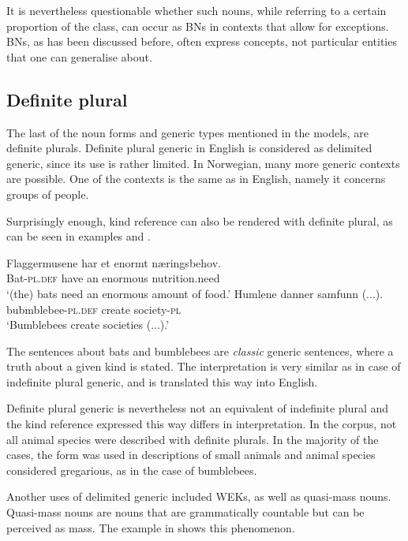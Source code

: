 \documentclass[output=paper]{langsci/langscibook}
\begin{document}
It is nevertheless questionable whether such nouns, while referring to a certain proportion of the class, can occur as BNs in contexts that allow for exceptions. BNs, as has been discussed before, often express concepts, not particular entities that one can generalise about.


\subsection{Definite plural}
\label{sub:defpl}
The last of the noun forms and generic types mentioned in the models, are definite plurals. Definite plural generic in English is considered as delimited generic, since its use is rather limited. In Norwegian, many more generic contexts are possible. One of the contexts is the same as in English, namely it concerns groups of people.

Surprisingly enough, kind reference can also be rendered with definite plural, as can be seen in examples  and .

\ea\label{ex:bats}
	\gll Flaggermusene har et enormt næringsbehov. \\
		Bat-\textsc{pl}.\textsc{def} have an enormous nutrition.need \\
	\glt `(the) bats need an enormous amount of food.'
\ex\label{ex:bumblebees}
	\gll Humlene danner samfunn (...). \\
		bubmblebee-\textsc{pl}.\textsc{def} create society-\textsc{pl} \\
	\glt `Bumblebees create societies (...).'
\z
    
The sentences about bats and bumblebees are \textit{classic} generic sentences, where a truth about a given kind is stated. The interpretation is very similar as in case of indefinite plural generic, and is translated this way into English.

Definite plural generic is nevertheless not an equivalent of indefinite plural and the kind reference expressed this way differs in interpretation. In the corpus, not all animal species were described with definite plurals. In the majority of the cases, the form was used in descriptions of small animals and animal species considered gregarious, as in the case of bumblebees.

Another uses of delimited generic included WEKs, as well as quasi-mass nouns. Quasi-mass nouns are nouns that are grammatically countable but can be perceived as mass. The example in  shows this phenomenon.
\end{document}
